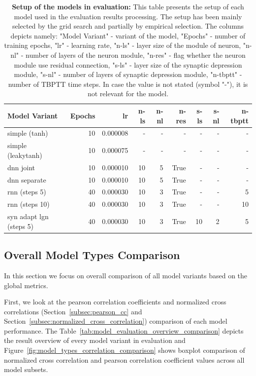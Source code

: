 \begin{table}
    \centering\footnotesize\sf
    \begin{tabular}{lrrrrrrrr}
        \toprule
        Model Variant & Epochs & lr & n-ls & n-nl & n-res & s-ls & s-nl & n-tbptt \\
        \midrule
        simple (tanh) & 10 & 0.000008 & - & - & - & - & - & - \\
        simple (leakytanh) & 10 & 0.000075 & - & - & - & - & - & - \\
        dnn joint & 10 & 0.000010 & 10 & 5 & True & - & - & - \\
        dnn separate & 10 & 0.000010 & 10 & 5 & True & - & - & - \\
        rnn (steps 5) & 40 & 0.000030 & 10 & 3 & True & - & - & 5 \\
        rnn (steps 10) & 40 & 0.000030 & 10 & 3 & True & - & - & 10 \\
        syn adapt lgn (steps 5) & 40 & 0.000030 & 10 & 3 & True & 10 & 2 & 5 \\
        \bottomrule
        \end{tabular}
    \caption{\textbf{Setup of the models in evaluation:} This table presents the setup of each model used in the evaluation results processing. The setup has been mainly selected by the grid search and partially by empirical selection. The columns depicts namely: "Model Variant" - variant of the model, "Epochs" - number of training epochs, "lr" - learning rate, "n-ls" - layer size of the module of neuron, "n-nl" - number of layers of the neuron module, "n-res" - flag whether the neuron module use residual connection, "s-ls" - layer size of the synaptic depression module, "s-nl" - number of layers of synaptic depression module, "n-tbptt" - number of TBPTT time steps. In case the value is not stated (symbol "-"), it is not relevant for the model.}
    \label{tab:evaluation_setup}
\end{table}

\subsection{Overall Model Types Comparison}
\label{subsec:overall_model_types_comparison}
In this section we focus on overall comparison of all model variants based on the global metrics.

First, we look at the pearson correlation coefficients and normalized cross correlations (Section~\ref{subsec:pearson_cc} and Section~\ref{subsec:normalized_cross_correlation}) comparison of each model performance. The Table~\ref{tab:model_evaluation_overview_comparison} depicts the result overview of every model variant in evaluation and Figure~\ref{fig:model_types_correlation_comparison} shows boxplot comparison of normalized cross correlation and pearson correlation coefficient values across all model subsets.

